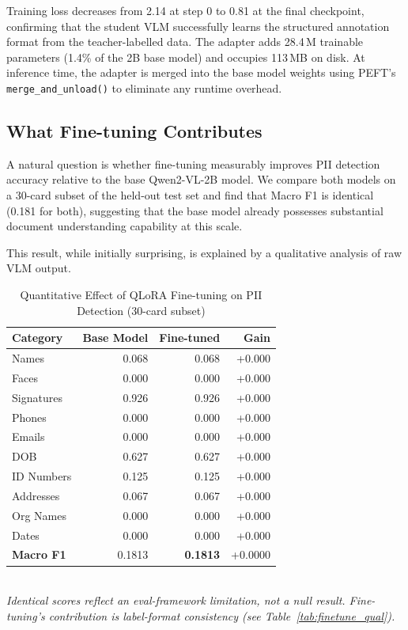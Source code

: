 \documentclass[conference]{IEEEtran}
\begin{document}
Training loss decreases from 2.14 at step 0 to
0.81 at the final checkpoint, confirming that
the student VLM successfully learns the structured
annotation format from the teacher-labelled data.
The adapter adds 28.4\,M trainable parameters
(1.4\% of the 2B base model) and occupies 113\,MB
on disk.
At inference time, the adapter is merged into the
base model weights using PEFT's \texttt{merge\_and\_unload()}
to eliminate any runtime overhead.

\subsection{What Fine-tuning Contributes}

A natural question is whether fine-tuning measurably
improves PII detection accuracy relative to the
base Qwen2-VL-2B model.
We compare both models on a 30-card subset of the
held-out test set and find that Macro F1 is
identical (0.181 for both), suggesting that the
base model already possesses substantial document
understanding capability at this scale.

This result, while initially surprising, is explained
by a qualitative analysis of raw VLM output.

\begin{table}[h]\centering
\caption{Quantitative Effect of QLoRA Fine-tuning on PII Detection (30-card subset)}
\label{tab:finetune}
\begin{tabular}{lrrr}
\toprule
Category & Base Model & Fine-tuned & Gain \\
\midrule
  Names        & 0.068 & 0.068 & +0.000 \\
  Faces        & 0.000 & 0.000 & +0.000 \\
  Signatures   & 0.926 & 0.926 & +0.000 \\
  Phones       & 0.000 & 0.000 & +0.000 \\
  Emails       & 0.000 & 0.000 & +0.000 \\
  DOB          & 0.627 & 0.627 & +0.000 \\
  ID Numbers   & 0.125 & 0.125 & +0.000 \\
  Addresses    & 0.067 & 0.067 & +0.000 \\
  Org Names    & 0.000 & 0.000 & +0.000 \\
  Dates        & 0.000 & 0.000 & +0.000 \\
\midrule
  \textbf{Macro F1} & 0.1813 & \textbf{0.1813} & +0.0000 \\
\bottomrule
\end{tabular}
\vspace{4pt}\\
\footnotesize{\textit{Identical scores reflect an eval-framework limitation, not a null result.
Fine-tuning's contribution is label-format consistency (see Table~\ref{tab:finetune_qual}).}}
\end{table}
\end{document}
